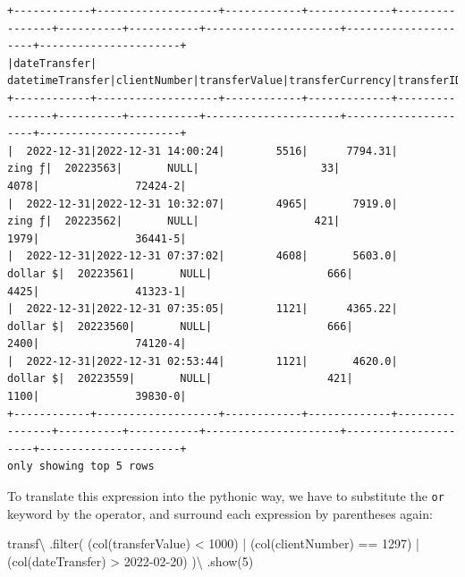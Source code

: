 \documentclass[
  11pt,
  letterpaper,
  DIV=11,
  numbers=noendperiod]{scrreprt}
\newenvironment{Shaded}{\begin{snugshade}}{\end{snugshade}}
\newcommand{\BuiltInTok}[1]{\textcolor[rgb]{0.00,0.23,0.31}{#1}}
\newcommand{\DecValTok}[1]{\textcolor[rgb]{0.68,0.00,0.00}{#1}}
\newcommand{\NormalTok}[1]{\textcolor[rgb]{0.00,0.23,0.31}{#1}}
\newcommand{\OperatorTok}[1]{\textcolor[rgb]{0.37,0.37,0.37}{#1}}
\newcommand{\StringTok}[1]{\textcolor[rgb]{0.13,0.47,0.30}{#1}}
\begin{document}
\begin{verbatim}
+------------+-------------------+------------+-------------+----------------+----------+-----------+---------------------+---------------------+----------------------+
|dateTransfer|   datetimeTransfer|clientNumber|transferValue|transferCurrency|transferID|transferLog|destinationBankNumber|destinationBankBranch|destinationBankAccount|
+------------+-------------------+------------+-------------+----------------+----------+-----------+---------------------+---------------------+----------------------+
|  2022-12-31|2022-12-31 14:00:24|        5516|      7794.31|          zing ƒ|  20223563|       NULL|                   33|                 4078|               72424-2|
|  2022-12-31|2022-12-31 10:32:07|        4965|       7919.0|          zing ƒ|  20223562|       NULL|                  421|                 1979|               36441-5|
|  2022-12-31|2022-12-31 07:37:02|        4608|       5603.0|        dollar $|  20223561|       NULL|                  666|                 4425|               41323-1|
|  2022-12-31|2022-12-31 07:35:05|        1121|      4365.22|        dollar $|  20223560|       NULL|                  666|                 2400|               74120-4|
|  2022-12-31|2022-12-31 02:53:44|        1121|       4620.0|        dollar $|  20223559|       NULL|                  421|                 1100|               39830-0|
+------------+-------------------+------------+-------------+----------------+----------+-----------+---------------------+---------------------+----------------------+
only showing top 5 rows
\end{verbatim}

To translate this expression into the pythonic way, we have to
substitute the \texttt{or} keyword by the \texttt{\textbar{}} operator,
and surround each expression by parentheses again:

\begin{Shaded}
\begin{Highlighting}[]
\NormalTok{transf}\OperatorTok{\textbackslash{}}
\NormalTok{  .}\BuiltInTok{filter}\NormalTok{(}
\NormalTok{    (col(}\StringTok{\textquotesingle{}transferValue\textquotesingle{}}\NormalTok{) }\OperatorTok{\textless{}} \DecValTok{1000}\NormalTok{) }\OperatorTok{|}
\NormalTok{    (col(}\StringTok{\textquotesingle{}clientNumber\textquotesingle{}}\NormalTok{) }\OperatorTok{==} \DecValTok{1297}\NormalTok{) }\OperatorTok{|}
\NormalTok{    (col(}\StringTok{\textquotesingle{}dateTransfer\textquotesingle{}}\NormalTok{) }\OperatorTok{\textgreater{}} \StringTok{\textquotesingle{}2022{-}02{-}20\textquotesingle{}}\NormalTok{)}
\NormalTok{  )}\OperatorTok{\textbackslash{}}
\NormalTok{  .show(}\DecValTok{5}\NormalTok{)}
\end{Highlighting}
\end{Shaded}
\end{document}
